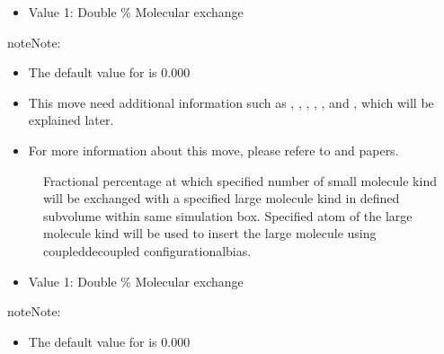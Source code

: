 \documentclass[letterpaper,10pt,english]{sphinxmanual}
\begin{document}
\begin{description}
\begin{description}
\end{description}
\begin{itemize}
\item {} 
Value 1: Double \sphinxhyphen{} \% Molecular exchange

\end{itemize}

\begin{sphinxadmonition}{note}{Note:}\begin{itemize}
\item {} 
The default value for  is 0.000

\item {} 
This move need additional information such as , , , , , and , which will be explained later.

\item {} 
For more information about this move, please refere to  and  papers.

\end{itemize}
\end{sphinxadmonition}
\begin{description}
\item[{}] \leavevmode
Fractional percentage at which specified number of small molecule kind will be exchanged with a specified large molecule kind in defined sub\sphinxhyphen{}volume within same simulation box. Specified atom of the large molecule kind will be used to insert the large molecule using coupled\sphinxhyphen{}decoupled configurational\sphinxhyphen{}bias.

\end{description}
\begin{itemize}
\item {} 
Value 1: Double \sphinxhyphen{} \% Molecular exchange

\end{itemize}

\begin{sphinxadmonition}{note}{Note:}\begin{itemize}
\item {} 
The default value for  is 0.000


\end{itemize}
\end{sphinxadmonition}
\end{description}
\end{document}
